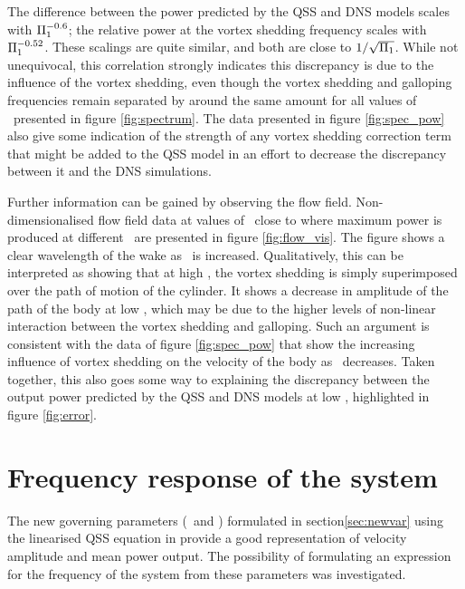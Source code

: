 The difference between the power predicted by the QSS and DNS models scales with $\Pi_1^{-0.6}$; the relative power at the vortex shedding frequency scales with $\Pi_1^{-0.52}$. These scalings are quite similar, and both are close to $1/\sqrt{\Pi_1}$. While not unequivocal, this correlation strongly indicates this discrepancy is due to the influence of the vortex shedding, even though the vortex shedding and galloping frequencies remain separated by around the same amount for all values of \massstiff\ presented in figure \ref{fig:spectrum}. The data presented in figure \ref{fig:spec_pow} also give some indication of the strength of any vortex shedding correction term that might be added to the QSS model in an effort to decrease the discrepancy between it and the DNS simulations.



Further information can be gained by observing the flow field. Non-dimensionalised flow field data at values of \massdamp\ close to where maximum power is produced at different \massstiff\ are presented in figure \ref{fig:flow_vis}. The figure shows a clear wavelength of the wake as \massstiff \ is increased. Qualitatively, this can be interpreted as showing that at high \massstiff, the vortex shedding is simply superimposed over the path of motion of the cylinder. It shows a decrease in amplitude of the path of the body at low \massstiff, which may be due to the higher levels of non-linear interaction between the vortex shedding and galloping. Such an argument is consistent with the data of figure \ref{fig:spec_pow} that show the increasing influence of vortex shedding on the velocity of the body as \massstiff\ decreases. Taken together, this also goes some way to explaining the discrepancy between the output power predicted by the QSS and DNS models at low \massstiff, highlighted in figure \ref{fig:error}.


\section{Frequency response of the system}

The new governing parameters (\massstiff\ and \massdamp) formulated in section\ref{sec:newvar}  using the linearised QSS equation in  provide a good representation of velocity amplitude and mean power output. The possibility of formulating an expression for the frequency of the system from these parameters was investigated.

